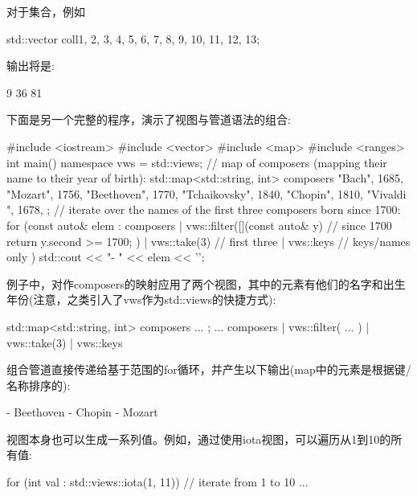 对于集合，例如

\begin{cpp}
std::vector coll{1, 2, 3, 4, 5, 6, 7, 8, 9, 10, 11, 12, 13};
\end{cpp}

输出将是:

\begin{shell}
9 36 81
\end{shell}

下面是另一个完整的程序，演示了视图与管道语法的组合:


\begin{cpp}
#include <iostream>
#include <vector>
#include <map>
#include <ranges>
int main()
{
	namespace vws = std::views;
	// map of composers (mapping their name to their year of birth):
	std::map<std::string, int> composers{
		{"Bach", 1685},
		{"Mozart", 1756},
		{"Beethoven", 1770},
		{"Tchaikovsky", 1840},
		{"Chopin", 1810},
		{"Vivaldi ", 1678},
	};
	// iterate over the names of the first three composers born since 1700:
	for (const auto& elem : composers
		| vws::filter([](const auto& y) { // since 1700
			return y.second >= 1700;
		})
		| vws::take(3) // first three
		| vws::keys // keys/names only
	) {
		std::cout << "- " << elem << '\n';
	}
}
\end{cpp}

例子中，对作composers的映射应用了两个视图，其中的元素有他们的名字和出生年份(注意，之类引入了vws作为std::views的快捷方式):

\begin{cpp}
std::map<std::string, int> composers{ ... };
...
composers
	| vws::filter( ... )
	| vws::take(3)
	| vws::keys
\end{cpp}

组合管道直接传递给基于范围的for循环，并产生以下输出(map中的元素是根据键/名称排序的):

\begin{shell}
- Beethoven
- Chopin
- Mozart
\end{shell}


视图本身也可以生成一系列值。例如，通过使用iota视图，可以遍历从1到10的所有值:

\begin{cpp}
for (int val : std::views::iota(1, 11)) { // iterate from 1 to 10
	...
}
\end{cpp}


